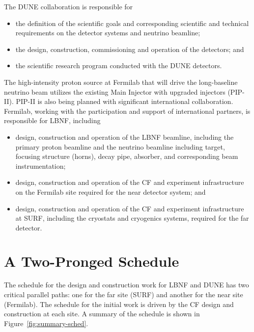 The DUNE collaboration is responsible for
\begin{itemize}
\item the definition of the scientific goals and corresponding scientific and technical requirements on the detector systems and neutrino beamline;
\item the design, construction, commissioning and operation of the detectors; and
\item the scientific research program conducted with the DUNE detectors. 
\end{itemize}

The high-intensity proton source at Fermilab that will drive the long-baseline neutrino beam utilizes the existing 
Main Injector with upgraded injectors (PIP-II).  PIP-II is also being planned with significant international collaboration.  Fermilab, working %
with the participation and support of international partners, is responsible for %
LBNF, including
\begin{itemize}
\item design, construction and operation of the LBNF beamline, including the primary proton beamline and the neutrino beamline including target, focusing structure (horns), decay pipe, absorber, and corresponding beam instrumentation;
\item design, construction and operation of the CF and %
experiment infrastructure on the Fermilab site required for the near detector system; and
\item design, construction and operation of the CF and %
experiment infrastructure %
at SURF, including the cryostats and cryogenics systems, required for the far detector.
\end{itemize}


\section{A Two-Pronged Schedule} %

The schedule for the design and construction work for LBNF and DUNE has two critical parallel paths: one for the %
far site (SURF) and %
another for the %
near site (Fermilab). The schedule for the initial work is driven by the CF design and construction at each site. A summary of the schedule is shown in Figure~\ref{fig:summary-sched}.

